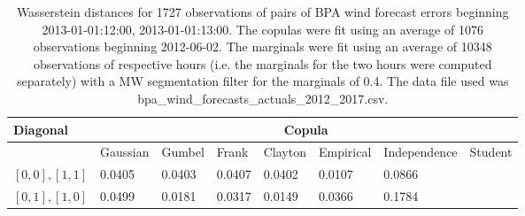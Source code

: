 \begin{table}[h] 
    \centering 
    \begin{tabular}{|l|l|l|l|l|l|l|l|} \hline 
        \textbf{Diagonal} & \multicolumn{7}{c|}{\textbf{Copula}} \\ \hline 
        & Gaussian & Gumbel & Frank & Clayton & Empirical & Independence & Student \\ \hline 
        $[0,0], [1,1]$ & 0.0405 & 0.0403 & 0.0407 & 0.0402 & 0.0107 & 0.0866 &  \\ \hline 
        $[0,1], [1,0]$ & 0.0499 & 0.0181 & 0.0317 & 0.0149 & 0.0366 & 0.1784 &  \\ \hline 
    \end{tabular} 
    \caption{Wasserstein distances for 1727 observations of pairs of BPA wind forecast errors beginning 2013-01-01:12:00, 2013-01-01:13:00. The copulas were fit  using an average of 1076 observations beginning 2012-06-02. The marginals were fit using an average of 10348 observations of respective hours (i.e. the  marginals for the two hours were computed separately) with a MW segmentation filter for the marginals of 0.4. The data file used was bpa\_wind\_forecasts\_actuals\_2012\_2017.csv.} 
\end{table}